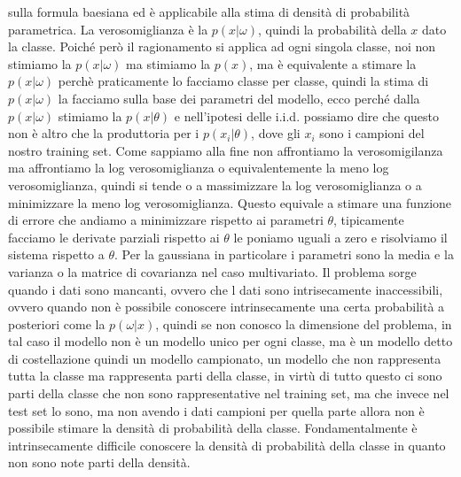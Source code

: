 sulla formula baesiana ed è applicabile alla stima di densità di probabilità parametrica. La verosomiglianza è la $p(x|\omega)$, quindi la probabilità della $x$ dato la classe. Poiché però il ragionamento si applica ad ogni singola classe, noi non stimiamo la $p(x|\omega)$ ma stimiamo la $p(x)$, ma è equivalente a stimare la $p(x|\omega)$ perchè praticamente lo facciamo classe per classe, quindi la stima di $p(x|\omega)$ la facciamo sulla base dei parametri del modello, ecco perché dalla $p(x|\omega)$ stimiamo la $p(x|\theta)$ e nell'ipotesi delle i.i.d. possiamo dire che questo non è altro che la produttoria per i $p(x_i|\theta)$, dove gli $x_i$ sono i campioni del nostro training set. Come sappiamo alla fine non affrontiamo la verosomigilanza ma affrontiamo la log verosomiglianza o equivalentemente la meno log verosomiglianza, quindi si tende o a massimizzare la log verosomiglianza o a minimizzare la meno log verosomiglianza. Questo equivale a stimare una funzione di errore che andiamo a minimizzare rispetto ai parametri $\theta$, tipicamente facciamo le derivate parziali rispetto ai $\theta$ le poniamo uguali a zero e risolviamo il sistema rispetto a $\theta$. Per la gaussiana in particolare i parametri sono la media e la varianza o la matrice di covarianza nel caso multivariato. Il problema sorge quando i dati sono mancanti, ovvero che l dati sono intrisecamente inaccessibili, ovvero quando non è possibile conoscere intrinsecamente una certa probabilità a posteriori come la $p(\omega|x)$, quindi se non conosco la dimensione del problema, in tal caso il modello non è un modello unico per ogni classe, ma è un modello detto di costellazione quindi un modello campionato, un modello che non rappresenta tutta la classe ma rappresenta parti della classe, in virtù di tutto questo ci sono parti della classe che non sono rappresentative nel training set, ma che invece nel test set lo sono, ma non avendo i dati campioni  per quella parte allora non è possibile stimare la densità di probabilità della classe. Fondamentalmente è intrinsecamente difficile conoscere la densità di probabilità della classe in quanto non sono note parti della densità.\\

